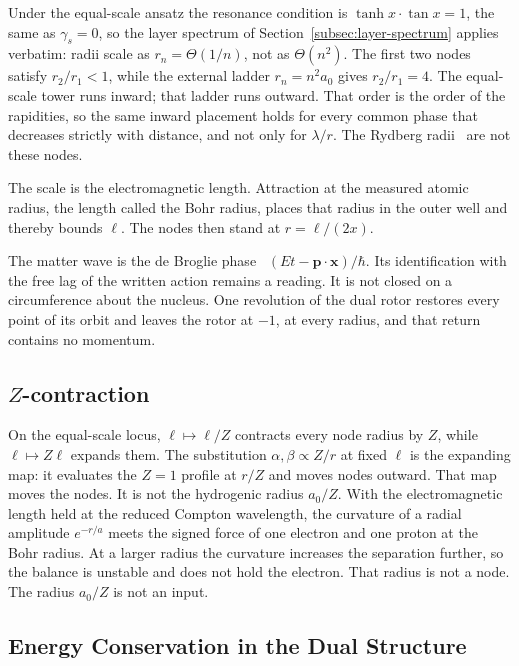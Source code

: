 \documentclass[a4paper]{article}
\begin{document}
Under the equal-scale ansatz the resonance condition is \(\tanh x\cdot\tan x=1\), the same as \(\gamma_s=0\), so the layer spectrum of Section~\ref{subsec:layer-spectrum} applies verbatim: radii scale as \(r_n=\Theta(1/n)\), not as \(\Theta(n^2)\). The first two nodes satisfy \(r_2/r_1<1\), while the external ladder \(r_n=n^2 a_0\) gives \(r_2/r_1=4\). The equal-scale tower runs inward; that ladder runs outward. That order is the order of the rapidities, so the same inward placement holds for every common phase that decreases strictly with distance, and not only for \(\lambda/r\). The Rydberg radii~\cite{rydberg1890} are not these nodes.

The scale is the electromagnetic length. Attraction at the measured atomic radius, the length called the Bohr radius, places that radius in the outer well and thereby bounds \(\ell\). The nodes then stand at \(r=\ell/(2x)\).

The matter wave is the de Broglie phase~\cite{debroglie1924} \((Et-\mathbf{p}\cdot\mathbf{x})/\hbar\). Its identification with the free lag of the written action remains a reading. It is not closed on a circumference about the nucleus. One revolution of the dual rotor restores every point of its orbit and leaves the rotor at \(-1\), at every radius, and that return contains no momentum.

\subsection{\texorpdfstring{$Z$-contraction}{Z-contraction}}

On the equal-scale locus, \(\ell\mapsto\ell/Z\) contracts every node radius by \(Z\), while \(\ell\mapsto Z\ell\) expands them. The substitution \(\alpha,\beta\propto Z/r\) at fixed \(\ell\) is the expanding map: it evaluates the \(Z=1\) profile at \(r/Z\) and moves nodes outward. That map moves the nodes. It is not the hydrogenic radius \(a_0/Z\). With the electromagnetic length held at the reduced Compton wavelength, the curvature of a radial amplitude \(e^{-r/a}\) meets the signed force of one electron and one proton at the Bohr radius. At a larger radius the curvature increases the separation further, so the balance is unstable and does not hold the electron. That radius is not a node. The radius \(a_0/Z\) is not an input.

\subsection{Energy Conservation in the Dual Structure}
\end{document}

